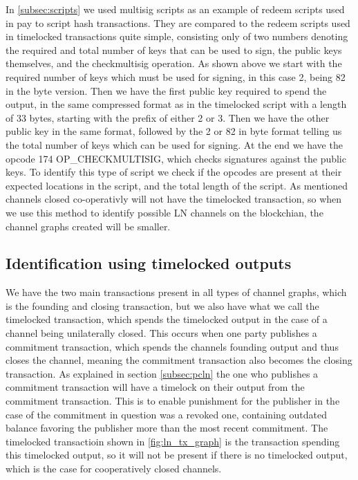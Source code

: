 In \cref{subsec:scripts} we used multisig scripts as an example of redeem scripts used in pay to script hash transactions. They are compared to the redeem scripts used in timelocked transactions quite simple, consisting only of two numbers denoting the required and total number of keys that can be used to sign, the public keys themselves, and the checkmultisig operation. As shown above we start with the required number of keys which must be used for signing, in this case 2, being 82 in the byte version. Then we have the first public key required to spend the output, in the same compressed format as in the timelocked script with a length of 33 bytes, starting with the prefix of either 2 or 3. Then we have the other public key in the same format, followed by the 2 or 82 in byte format telling us the total number of keys which can be used for signing. At the end we have the opcode 174 OP\_CHECKMULTISIG, which checks signatures against the public keys. To identify this type of script we check if the opcodes are present at their expected locations in the script, and the total length of the script. As mentioned channels closed co-operativly will not have the timelocked transaction, so when we use this method to identify possible LN channels on the blockchian, the channel graphs created will be smaller.
\\



\subsection{Identification using timelocked outputs}
\label{timelocked_identification}

We have the two main transactions present in all types of channel graphs, which is the founding and closing transaction, but we also have what we call the timelocked transaction, which spends the timelocked output in the case of a channel being unilaterally closed.
This occurs when one party publishes a commitment transaction, which spends the channels founding output and thus closes the channel, meaning the commitment transaction also becomes the closing transaction. As explained in section \cref{subsec:pcln} the one who publishes a commitment transaction will have a timelock on their output from the commitment transaction. This is to enable punishment for the publisher in the case of the commitment in question was a revoked one, containing outdated balance favoring the publisher more than the most recent commitment. 
The timelocked transactioin shown in \cref{fig:ln_tx_graph} is the transaction spending this timelocked output, so it will not be present if there is no timelocked output, which is the case for cooperatively closed channels.
\\




